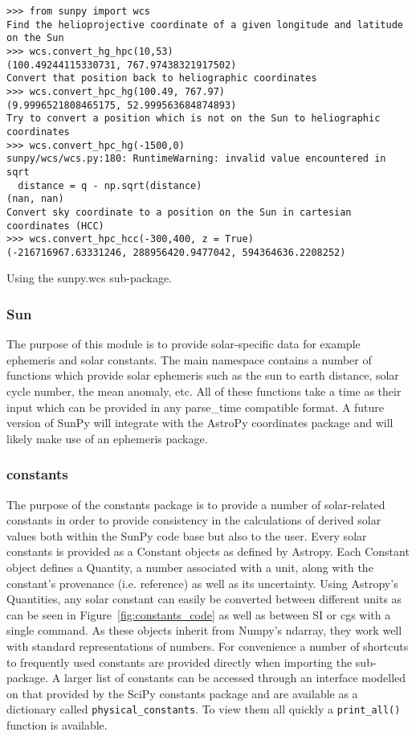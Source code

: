 \begin{listing}[H]
\begin{verbatim}
>>> from sunpy import wcs
Find the helioprojective coordinate of a given longitude and latitude on the Sun
>>> wcs.convert_hg_hpc(10,53)
(100.49244115330731, 767.97438321917502)
Convert that position back to heliographic coordinates
>>> wcs.convert_hpc_hg(100.49, 767.97)
(9.9996521808465175, 52.999563684874893)
Try to convert a position which is not on the Sun to heliographic coordinates
>>> wcs.convert_hpc_hg(-1500,0)
sunpy/wcs/wcs.py:180: RuntimeWarning: invalid value encountered in sqrt
  distance = q - np.sqrt(distance)
(nan, nan)
Convert sky coordinate to a position on the Sun in cartesian coordinates (HCC)
>>> wcs.convert_hpc_hcc(-300,400, z = True)
(-216716967.63331246, 288956420.9477042, 594364636.2208252)
\end{verbatim}
\caption{Using the sunpy.wcs sub-package.}
\label{code:wcs_code}
\end{listing}

\subsubsection{Sun}
The purpose of this module is to provide solar-specific data for example ephemeris and
solar constants. The main namespace contains a number of functions which provide solar
ephemeris such as the sun to earth distance, solar cycle number, the mean anomaly, etc.
All of these functions take a time as their input which can be provided in any 
parse\_time
compatible format. 
A future version of SunPy will integrate with the AstroPy coordinates package and will 
likely make use of an ephemeris package.

\subsubsection{constants}
The purpose of the constants package is to provide a number of solar-related 
constants in order to provide consistency in the calculations of derived solar 
values both within the SunPy code base but also to the user. Every solar 
constants is provided as a Constant objects as defined by Astropy. Each 
Constant object defines a Quantity, a number associated with a unit, along with 
the constant's provenance (i.e. reference) as well as its uncertainty. Using 
Astropy's Quantities, any solar constant can easily be converted between 
different units as can be seen in Figure~\ref{fig:constants_code} as well
as between SI or cgs with a single command.  As these objects inherit from 
Numpy's ndarray, they work well with standard representations of numbers.
For convenience a number of shortcuts to frequently used constants are provided 
directly when importing the sub-package. A larger list of constants can be 
accessed through an interface modelled on that provided by the SciPy constants 
package and are available as a dictionary called \texttt{physical\_constants}. 
To view them all quickly a \texttt{print\_all()} function is available.

